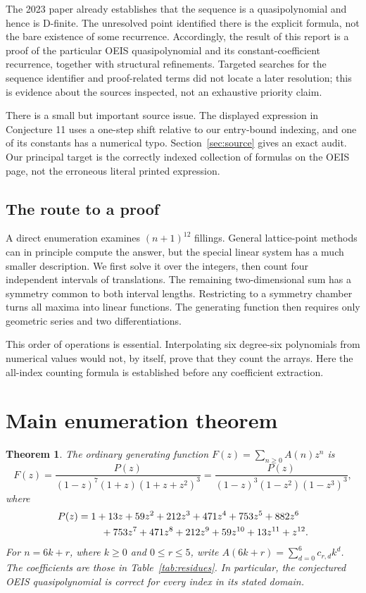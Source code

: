 \documentclass[11pt]{article}
\numberwithin{equation}{section}
\newtheorem{theorem}{Theorem}[section]
\theoremstyle{definition}
\begin{document}
The 2023 paper already establishes that the sequence is a quasipolynomial and
hence is D-finite. The unresolved point identified there is the explicit
formula, not the bare existence of some recurrence. Accordingly, the result
of this report is a proof of the particular OEIS quasipolynomial and its
constant-coefficient recurrence, together with structural refinements.
Targeted searches for the sequence identifier and proof-related terms did not
locate a later resolution; this is evidence about the sources inspected, not
an exhaustive priority claim.

There is a small but important source issue. The displayed expression in
Conjecture 11 uses a one-step shift relative to our entry-bound indexing, and
one of its constants has a numerical typo. Section~\ref{sec:source} gives an
exact audit. Our principal target is the correctly indexed collection of
formulas on the OEIS page, not the erroneous literal printed expression.

\subsection{The route to a proof}
A direct enumeration examines $(n+1)^{12}$ fillings. General lattice-point
methods can in principle compute the answer, but the special linear system
has a much smaller description. We first solve it over the integers, then
count four independent intervals of translations. The remaining two-dimensional
sum has a symmetry common to both interval lengths. Restricting to a symmetry
chamber turns all maxima into linear functions. The generating function then
requires only geometric series and two differentiations.

This order of operations is essential. Interpolating six degree-six
polynomials from numerical values would not, by itself, prove that they count
the arrays. Here the all-index counting formula is established before any
coefficient extraction.

\section{Main enumeration theorem}
\label{sec:main}

\begin{theorem}\label{thm:main}
The ordinary generating function $F(z)=\sum_{n\geq0}A(n)z^n$ is
\begin{equation}\label{eq:mainGF}
 F(z)=\frac{P(z)}{(1-z)^7(1+z)(1+z+z^2)^3}
     =\frac{P(z)}{(1-z)^3(1-z^2)(1-z^3)^3},
\end{equation}
where
\begin{align}\label{eq:P}
P(z)={}&1+13z+59z^2+212z^3+471z^4+753z^5+882z^6\notag\\
      &\quad+753z^7+471z^8+212z^9+59z^{10}+13z^{11}+z^{12}.
\end{align}
For $n=6k+r$, where $k\geq0$ and $0\leq r\leq5$, write
$A(6k+r)=\sum_{d=0}^6 c_{r,d}k^d$. The coefficients are those in
Table~\ref{tab:residues}. In particular, the conjectured OEIS quasipolynomial
is correct for every index in its stated domain.
\end{theorem}
\end{document}
